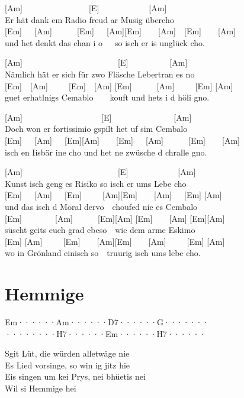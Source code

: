 \documentclass[
  letterpaper,
  twoside=false]{scrbook}
\begin{document}
{[}Am{]}~~~~~~~~~~~~~~~~{[}E{]}~~~~~~~~~~~~{[}Am{]}\\
Er hät dank em Radio freud ar Musig übercho\\
{[}Em{]}~~~{[}Am{]}~~~~~~{[}Em{]}~~~{[}Am{]}{[}Em{]}~~~~{[}Am{]}~~{[}Em{]}~~~~{[}Am{]}\\
und het denkt das chan i o~~~so isch er is unglück cho.

{[}Am{]}~~~~~~~~~~~~~~~~~~~~~~~{[}E{]}~~~~~~~~~~{[}Am{]}\\
Nämlich hät er sich für zwo Fläsche Lebertran es no\\
{[}Em{]}~~{[}Am{]}~~~~~{[}Em{]}~~{[}Am{]}
{[}Em{]}~~~~~~{[}Am{]}~~~~~{[}Em{]} {[}Am{]}\\
guet erhatlnigs Cemablo~~~~kouft und hets i d höli gno.

{[}Am{]}~~~~~~~~~~~~~~~~~~~{[}E{]}~~~~~~~~~~~~~~~{[}Am{]}\\
Doch won er fortissimio gspilt het uf sim Cembalo\\
{[}Em{]}~~~{[}Am{]}~~~{[}Em{]}{[}Am{]}~~~~{[}Em{]}~~~{[}Am{]}~~~~~~{[}Em{]}~~~~{[}Am{]}\\
isch en Iisbär ine cho und het ne zwüsche d chralle gno.

{[}Am{]}~~~~~~~~~~~~~~~~~~~~~~~{[}E{]}~~~~~~~~~~~~{[}Am{]}\\
Kunst isch geng es Risiko so isch er ums Lebe cho\\
{[}Em{]}~~~{[}Am{]}~~~{[}Em{]}~~~~~{[}Am{]}{[}Em{]}~~~~{[}Am{]}~~~{[}Em{]}
{[}Am{]}\\
und das isch d Moral dervo~~choufed nie es Cembalo\\
{[}Em{]}~~~~~~~~{[}Am{]}~~~~~~{[}Em{]}{[}Am{]} {[}Em{]}~~~~{[}Am{]}
{[}Em{]}{[}Am{]}\\
süscht geits euch grad ebeso~~wie dem arme Eskimo\\
{[}Em{]}
{[}Am{]}~~~~~{[}Em{]}~~~~{[}Am{]}{[}Em{]}~~~~{[}Am{]}~~~~~{[}Em{]}
{[}Am{]}\\
wo in Grönland einisch so~~truurig isch ums lebe cho.

\hypertarget{hemmige}{%
\chapter{Hemmige}\label{hemmige}}

\textbar Em······\textbar Am······\textbar D7······\textbar G·······\textbar{}\\
\textbar········\textbar H7······\textbar Em······\textbar H7······\textbar{}

S\textquotesingle git Lüt, die würden alletwäge nie\\
Es Lied vorsinge, so win ig jitz hie\\
Eis singen um kei Prys, nei bhüetis nei\\
Wil si Hemmige hei
\end{document}
